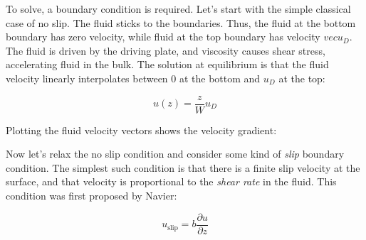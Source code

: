 \documentclass[a4paper]{report}
\begin{document}
To solve, a boundary condition is required. Let's start with the simple classical case of no slip.  The fluid sticks to the boundaries.  Thus, the fluid at the bottom boundary has zero velocity, while fluid at the top boundary has velocity $vec{u}_{D}$. The fluid is driven by the driving plate, and viscosity causes shear stress, accelerating fluid in the bulk. The solution at equilibrium is that the fluid velocity linearly interpolates between 0 at the bottom and $u_{D}$ at the top:

\begin{equation}
u(z) = \frac{z}{W}u_{D}  
\end{equation}


Plotting the fluid velocity vectors shows the velocity gradient:

\vspace{1em}

\begin{center}
\end{center}


\vspace{1em}
Now let's relax the no slip condition and consider some kind of \emph{slip} boundary condition. The simplest such condition is that there is a finite slip velocity at the surface, and that velocity is proportional to the \emph{shear rate} in the fluid. This condition was first proposed by Navier:

\begin{equation}
u_{\mathrm{slip}} = b \frac{\partial u}{\partial z}
\end{equation}
\end{document}
